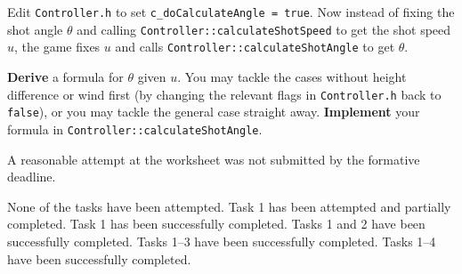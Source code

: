 \documentclass{../../../fal_assignment}
\begin{document}
Edit \texttt{Controller.h} to set \lstinline{c_doCalculateAngle = true}.
Now instead of fixing the shot angle $\theta$ and calling \lstinline{Controller::calculateShotSpeed} to get the shot speed $u$,
the game fixes $u$ and calls \lstinline{Controller::calculateShotAngle} to get $\theta$.

\textbf{Derive} a formula for $\theta$ given $u$.
You may tackle the cases without height difference or wind first (by changing the relevant flags in \texttt{Controller.h} back to \lstinline{false}),
or you may tackle the general case straight away.
\textbf{Implement} your formula in \lstinline{Controller::calculateShotAngle}.

\begin{markingrubric}
		\grade\fail	A reasonable attempt at the worksheet was not submitted by the formative deadline.
		\vspace{\baselineskip}
		
        \grade\fail None of the tasks have been attempted.
		\grade Task 1 has been attempted and partially completed.
		\grade Task 1 has been successfully completed.
		\grade Tasks 1 and 2 have been successfully completed.
		\grade Tasks 1--3 have been successfully completed.
		\grade Tasks 1--4 have been successfully completed.


\end{markingrubric}
\end{document}

